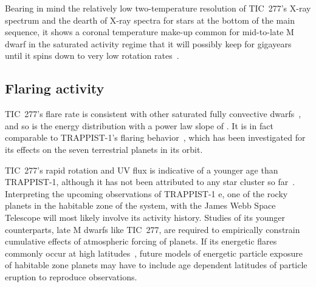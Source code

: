 \documentclass[twocolumn]{aastex631}
\begin{document}
Bearing in mind the relatively low two-temperature resolution of TIC~277's X-ray spectrum and the dearth of X-ray spectra for stars at the bottom of the main sequence, it shows a coronal temperature make-up common for mid-to-late M dwarf in the saturated activity regime that it will possibly keep for gigayears until it spins down to very low rotation rates~\citep{medina2022galactic, engle2023living}. 

\subsection{Flaring activity}
\label{sec:discussion:flares}

TIC~277's flare rate is consistent with other saturated fully convective dwarfs~\citep{medina2020flare, murray2022study}, and so is the energy distribution with a power law slope of \ffdalpha\unskip. It is in fact comparable to TRAPPIST-1's flaring behavior~\citep{paudel2018k2}, which has been investigated for its effects on the seven terrestrial planets in its orbit. 


TIC~277's rapid rotation and UV flux is indicative of a younger age than TRAPPIST-1, although it has not been attributed to any star cluster so far~\citep{schneider2018hazmat}. Interpreting the upcoming observations of TRAPPIST-1 e, one of the rocky planets in the habitable zone of the system, with the James Webb Space Telescope will most likely involve its activity history. Studies of its younger counterparts, late M dwarfs like TIC~277, are required to empirically constrain cumulative effects of atmospheric forcing of planets. If its energetic flares commonly occur at high latitudes~\citep{ilin2021giant}, future models of energetic particle exposure of habitable zone planets may have to include age dependent latitudes of particle eruption to reproduce observations. 
\end{document}
